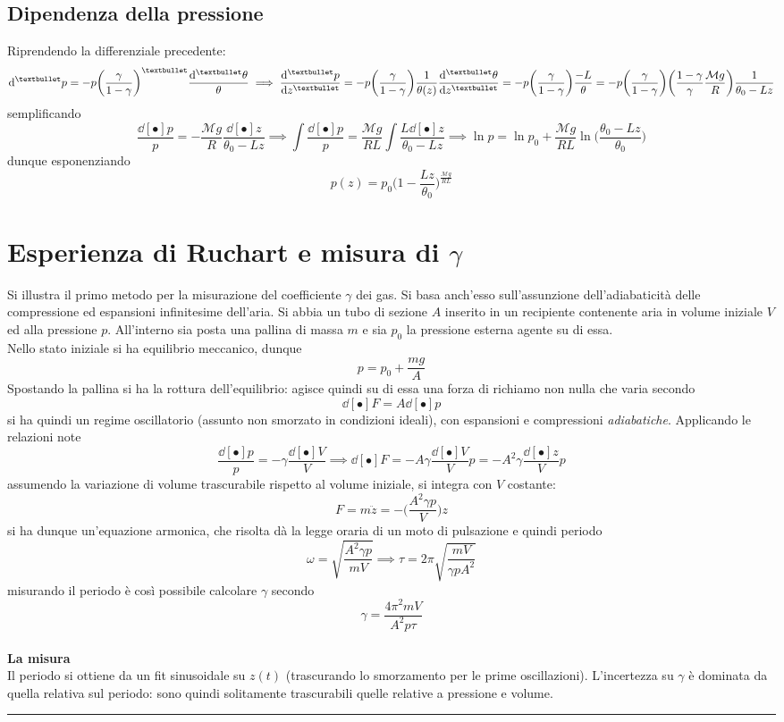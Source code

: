 \documentclass[10pt, oneside]{book}
\newcommand{\molms}{\mathcal{M}}
\newcommand{\infobox}[2]{\vspace{0.5cm}~\\ \textbf{#1} \hrulefill \vspace{0.2cm}\\#2 {}\,\\\hrule \vspace{0.5cm}}
\newcommand{\ds}{\displaystyle}
\begin{document}
\subsection{Dipendenza della pressione}
Riprendendo la differenziale precedente:
\[\dd[•]{p} = - p \bigg(\frac{\gamma}{1-\gamma}\bigg)^{•} \frac{\dd[•]{\theta}}{\theta} \implies \dv[•]{p}{z} = - p \bigg(\frac{\gamma}{1 - \gamma}\bigg) \frac{1}{\theta(z)} \dv[•]{\theta}{z} = - p \bigg(\frac{\gamma}{1 - \gamma}\bigg) \frac{-L}{\theta} = - p \bigg(\frac{\gamma}{1 - \gamma}\bigg) \bigg(\frac{1 - \gamma}{\gamma} \frac{\molms g}{R}\bigg) \frac{1}{\theta_0 - Lz}\]
semplificando
\[\frac{\dd[•]{p}}{p} = - \frac{\molms g}{R} \frac{\dd[•]{z}}{\theta_0 - Lz} \implies \int \frac{\dd[•]{p}}{p} = \frac{\molms g}{RL} \int \frac{L \dd[•]{z}}{\theta_0 - Lz} \implies \ln p = \ln p_0 + \frac{\molms g}{RL} \ln \bigg( \frac{\theta_0 - Lz}{\theta_0}\bigg)\]
dunque esponenziando 
\[p(z) = p_0 \bigg(1 - \frac{Lz}{\theta_0}\bigg)^{\ds \frac{\molms g}{RL}}\]

\section{Esperienza di Ruchart e misura di $\gamma$}
Si illustra il primo metodo per la misurazione del coefficiente $\gamma$ dei gas. Si basa anch'esso sull'assunzione dell'adiabaticità delle compressione ed espansioni infinitesime dell'aria. Si abbia un tubo di sezione $A$ inserito in un recipiente contenente aria in volume iniziale $V$ ed alla pressione $p$. All'interno sia posta una pallina di massa $m$ e sia $p_0$ la pressione esterna agente su di essa.\\
Nello stato iniziale si ha equilibrio meccanico, dunque
\[p = p_0 + \frac{mg}{A}\] 
Spostando la pallina si ha la rottura dell'equilibrio: agisce quindi su di essa una forza di richiamo non nulla che varia secondo
\[\dd[•]{F} = A \dd[•]{p}\]
si ha quindi un regime oscillatorio (assunto non smorzato in condizioni ideali), con espansioni e compressioni \textit{adiabatiche}. Applicando le relazioni note
\[\frac{\dd[•]{p}}{p} = - \gamma \frac{\dd[•]{V}}{V} \implies \dd[•]{F} = - A \gamma \frac{\dd[•]{V}}{V}p =  - A^2 \gamma \frac{\dd[•]{z}}{V}p\]
assumendo la variazione di volume trascurabile rispetto al volume iniziale, si integra con $V$ costante:
\[F = m \ddot z = - \bigg(\frac{A^2 \gamma p}{V}\bigg)z\]
si ha dunque un'equazione armonica, che risolta dà la legge oraria di un moto di pulsazione e quindi periodo
\[\omega = \sqrt{\frac{A^2 \gamma p}{m V}} \implies \tau = 2 \pi \sqrt{\frac{mV}{\gamma p A^2}}\]
misurando il periodo è così possibile calcolare $\gamma$ secondo
\[\gamma = \frac{4 \pi^2 m V}{A^2 p \tau}\]
\infobox{La misura}{Il periodo si ottiene da un fit sinusoidale su $z(t)$ (trascurando lo smorzamento per le prime oscillazioni). L'incertezza su $\gamma$ è dominata da quella relativa sul periodo: sono quindi solitamente trascurabili quelle relative a pressione e volume.}
\end{document}
